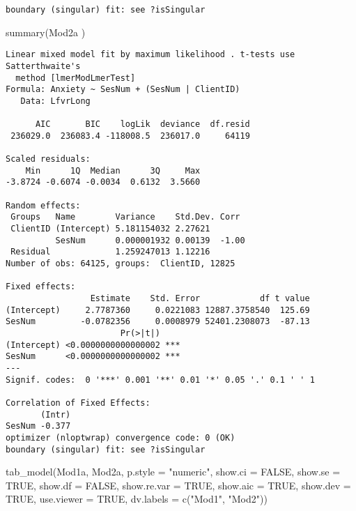 \documentclass[
  11pt,
]{book}
\newenvironment{Shaded}{\begin{snugshade}}{\end{snugshade}}
\newcommand{\AttributeTok}[1]{\textcolor[rgb]{0.77,0.63,0.00}{#1}}
\newcommand{\ConstantTok}[1]{\textcolor[rgb]{0.00,0.00,0.00}{#1}}
\newcommand{\FunctionTok}[1]{\textcolor[rgb]{0.00,0.00,0.00}{#1}}
\newcommand{\NormalTok}[1]{#1}
\newcommand{\StringTok}[1]{\textcolor[rgb]{0.31,0.60,0.02}{#1}}
\begin{document}
\begin{verbatim}
boundary (singular) fit: see ?isSingular
\end{verbatim}

\begin{Shaded}
\begin{Highlighting}[]
\FunctionTok{summary}\NormalTok{(Mod2a )}
\end{Highlighting}
\end{Shaded}

\begin{verbatim}
Linear mixed model fit by maximum likelihood . t-tests use Satterthwaite's
  method [lmerModLmerTest]
Formula: Anxiety ~ SesNum + (SesNum | ClientID)
   Data: LfvrLong

      AIC       BIC    logLik  deviance  df.resid 
 236029.0  236083.4 -118008.5  236017.0     64119 

Scaled residuals: 
    Min      1Q  Median      3Q     Max 
-3.8724 -0.6074 -0.0034  0.6132  3.5660 

Random effects:
 Groups   Name        Variance    Std.Dev. Corr 
 ClientID (Intercept) 5.181154032 2.27621       
          SesNum      0.000001932 0.00139  -1.00
 Residual             1.259247013 1.12216       
Number of obs: 64125, groups:  ClientID, 12825

Fixed effects:
                 Estimate    Std. Error            df t value
(Intercept)     2.7787360     0.0221083 12887.3758540  125.69
SesNum         -0.0782356     0.0008979 52401.2308073  -87.13
                       Pr(>|t|)    
(Intercept) <0.0000000000000002 ***
SesNum      <0.0000000000000002 ***
---
Signif. codes:  0 '***' 0.001 '**' 0.01 '*' 0.05 '.' 0.1 ' ' 1

Correlation of Fixed Effects:
       (Intr)
SesNum -0.377
optimizer (nloptwrap) convergence code: 0 (OK)
boundary (singular) fit: see ?isSingular
\end{verbatim}

\begin{Shaded}
\begin{Highlighting}[]
\FunctionTok{tab\_model}\NormalTok{(Mod1a, Mod2a, }\AttributeTok{p.style =} \StringTok{"numeric"}\NormalTok{, }\AttributeTok{show.ci =} \ConstantTok{FALSE}\NormalTok{, }\AttributeTok{show.se =} \ConstantTok{TRUE}\NormalTok{, }\AttributeTok{show.df =} \ConstantTok{FALSE}\NormalTok{, }\AttributeTok{show.re.var =} \ConstantTok{TRUE}\NormalTok{, }\AttributeTok{show.aic =} \ConstantTok{TRUE}\NormalTok{, }\AttributeTok{show.dev =} \ConstantTok{TRUE}\NormalTok{, }\AttributeTok{use.viewer =} \ConstantTok{TRUE}\NormalTok{, }\AttributeTok{dv.labels =} \FunctionTok{c}\NormalTok{(}\StringTok{"Mod1"}\NormalTok{, }\StringTok{"Mod2"}\NormalTok{))}
\end{Highlighting}
\end{Shaded}
\end{document}
